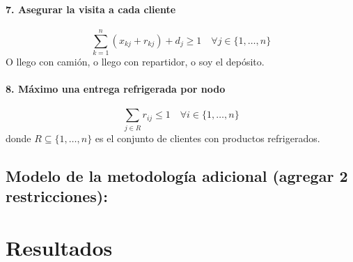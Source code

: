 \documentclass{article}
\begin{document}
\paragraph{7. Asegurar la visita a cada cliente}
\[
\sum_{k=1}^{n} (x_{kj} + r_{kj}) + d_j \geq 1 \quad \forall j \in \{1, \dots, n\}
\]
O llego con camión, o llego con repartidor, o soy el depósito.

\paragraph{8. Máximo una entrega refrigerada por nodo}
\[
\sum_{j \in R} r_{ij} \leq 1 \quad \forall i \in \{1, \dots, n\}
\]
donde \( R \subseteq \{1, \dots, n\} \) es el conjunto de clientes con productos refrigerados.




\subsection{Modelo de la metodología adicional (agregar 2 restricciones):} \label{modelo1}


\section{Resultados}
\end{document}
